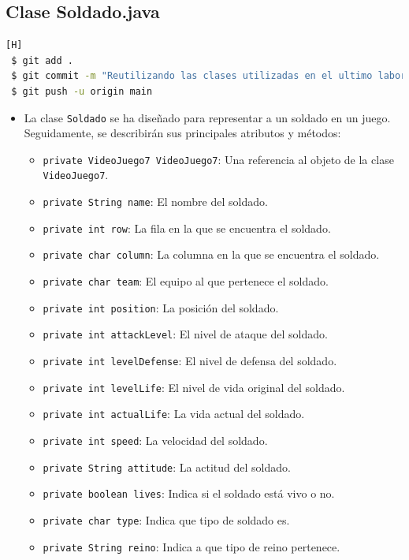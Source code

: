\documentclass{article}
\begin{document}


\subsection{Clase Soldado.java}
\begin{lstlisting}[language=bash,caption={Commit \href{https://github.com/hernanchoquehuanca/fp2-23b/commit/10a3bb4416e681287c7efd60e065e5a9d5bd097f}{10a3bb4}: Se reutilizo las clases del laboratorio anterior}][H]
 $ git add .
 $ git commit -m "Reutilizando las clases utilizadas en el ultimo laboratorio (12)"			
 $ git push -u origin main
\end{lstlisting}

\begin{itemize}	
    \item La clase \texttt{Soldado} se ha diseñado para representar a un soldado en un juego. Seguidamente, se describirán sus principales atributos y métodos:
    \begin{itemize}
        \item \texttt{private VideoJuego7 VideoJuego7}: Una referencia al objeto de la clase \texttt{VideoJuego7}.
        \item \texttt{private String name}: El nombre del soldado.
        \item \texttt{private int row}: La fila en la que se encuentra el soldado.
        \item \texttt{private char column}: La columna en la que se encuentra el soldado.
        \item \texttt{private char team}: El equipo al que pertenece el soldado.
        \item \texttt{private int position}: La posición del soldado.
        \item \texttt{private int attackLevel}: El nivel de ataque del soldado.
        \item \texttt{private int levelDefense}: El nivel de defensa del soldado.
        \item \texttt{private int levelLife}: El nivel de vida original del soldado.
        \item \texttt{private int actualLife}: La vida actual del soldado.
        \item \texttt{private int speed}: La velocidad del soldado.
        \item \texttt{private String attitude}: La actitud del soldado.
        \item \texttt{private boolean lives}: Indica si el soldado está vivo o no.
        \item \texttt{private char type}: Indica que tipo de soldado es.
        \item \texttt{private String reino}: Indica a que tipo de reino pertenece.
    \end{itemize}
\end{itemize}
    
\end{document}
